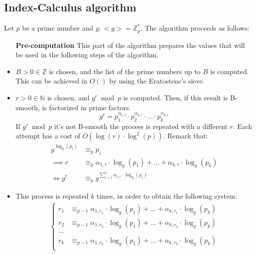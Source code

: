 \subsection{Index-Calculus algorithm}
Let $p$ be a prime number and $g: <g> = \mathbb{Z}_{p}^{*}$. The algorithm proceeds as follows:
\begin{itemize}
    \item[\textbf{Pre-computation}] This part of the algorithm prepares the values that will be used in the following steps of the algorithm.
    \item $B > 0 \in \mathbb{Z}$ is chosen, and the list of the prime numbers up to $B$ is computed. This can be achieved in $O()$ by using the Eratostene's sieve.
    \item $r > 0 \in \mathbb{N}$ is chosen, and $g^r \bmod p$ is computed. Then, if this result is B-smooth, is factorized in prime factors.
    \[g^{r} = p_{1}^{\alpha_{1, r}} \cdot p_{2}^{\alpha_{2, r}} \cdot \dots \cdot p_{k}^{\alpha_{k, r}}\]
    If $g^r \bmod p$ it's not B-smooth the process is repeated with a different $r$. Each attempt has a cost of $O(\operatorname{log}(r) \cdot \operatorname{log}^{2}(p))$. Remark that:
    \begin{align*}
        g^{\operatorname{log}_{g}(p_{i})} &\equiv_{p} p_{i}\\
        \implies r &\equiv_{p} \alpha_{1, r} \cdot \operatorname{log}_{g}(p_{1}) + \dots + \alpha_{k, r} \cdot \operatorname{log}_{g}(p_{k})\\
        \iff g^{r} &\equiv_{p} g^{\sum_{i=1}^{k} \alpha_{i, r} \cdot \operatorname{log}_{g}(p_{i})}
    \end{align*}
    \item This process is repeated $k$ times, in order to obtain the following system:
    \begin{align*}
        \begin{cases}
            r_{1} &\equiv_{p-1} \alpha_{1, r_{1}} \cdot \operatorname{log}_{g}(p_{1}) + \dots + \alpha_{k, r_{1}} \cdot \operatorname{log}_{g}(p_{k})\\
            r_{2} &\equiv_{p-1} \alpha_{1, r_{2}} \cdot \operatorname{log}_{g}(p_{1}) + \dots + \alpha_{k, r_{2}} \cdot \operatorname{log}_{g}(p_{k})\\
            \dots\\
            r_{k} &\equiv_{p-1} \alpha_{1, r_{k}} \cdot \operatorname{log}_{g}(p_{1}) + \dots + \alpha_{k, r_{k}} \cdot \operatorname{log}_{g}(p_{k})\\
        \end{cases}

\end{align*}
\end{itemize}
